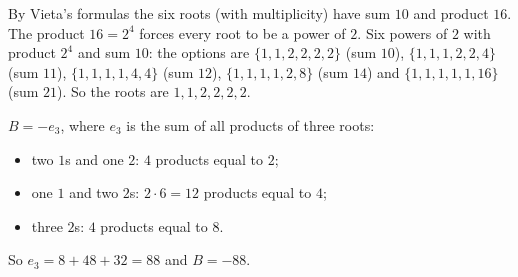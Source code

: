 By Vieta's formulas the six roots (with multiplicity) have sum $10$ and product $16$. The product $16=2^4$ forces every root to be a power of $2$. Six powers of $2$ with product $2^4$ and sum $10$: the options are $\{1,1,2,2,2,2\}$ (sum $10$), $\{1,1,1,2,2,4\}$ (sum $11$), $\{1,1,1,1,4,4\}$ (sum $12$), $\{1,1,1,1,2,8\}$ (sum $14$) and $\{1,1,1,1,1,16\}$ (sum $21$). So the roots are $1,1,2,2,2,2$.

$B=-e_3$, where $e_3$ is the sum of all products of three roots:
\begin{itemize}
\item two $1$s and one $2$: $4$ products equal to $2$;
\item one $1$ and two $2$s: $2\cdot6=12$ products equal to $4$;
\item three $2$s: $4$ products equal to $8$.
\end{itemize}
So $e_3=8+48+32=88$ and $B=\boxed{-88}$.
